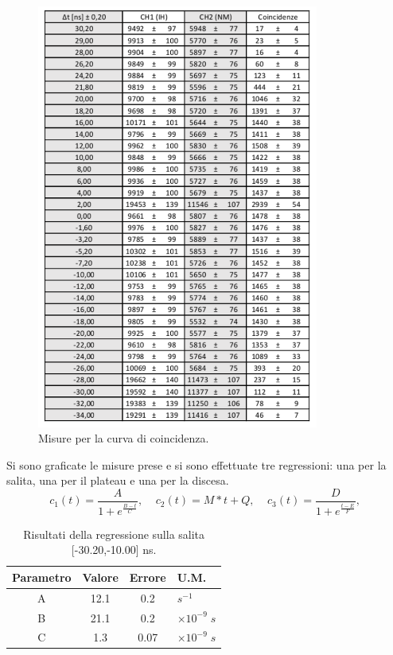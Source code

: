 \documentclass[11pt]{article} %
\begin{document}
\begin{figure}[h!]
\begin{center}
\includegraphics[width=350px]{img/table_C.pdf}
\caption{Misure per la curva di coincidenza.}
\label{fig:table_C}
\end{center}
\end{figure}
Si sono graficate le misure prese e si sono effettuate tre regressioni: una per la salita, una per il plateau e una per la discesa.
\begin{equation}
c_1\left( t \right) =\frac{A}{1+e^{\frac{B-t}{C}}},\;\;\;\;c_2  \left( t \right) = M*t+Q,\;\;\;\;c_3 \left( t \right) =\frac{D}{1+e^{\frac{t-E}{F}}},\;
\end{equation}
\newpage
\begin{table}[!h]
\begin{center}
\begin{tabular}{|c|c|c|l|}
\hline
\multicolumn{1}{|l|}{Parametro} & \multicolumn{1}{l|}{Valore} & \multicolumn{1}{l|}{Errore} & U.M. \\ \hline
A                               & 12.1                       & 0.2                      & $s^{-1}$     \\ \hline
B                               & 21.1                        & 0.2                           & $\times10^{-9}\;s$    \\ \hline
C                               & 1.3                          & 0.07                          &  $\times10^{-9}\;s$    \\ \hline
\end{tabular}
\end{center}
\caption{Risultati della regressione sulla salita [-30.20,-10.00] ns.}
\end{table}
\end{document}
